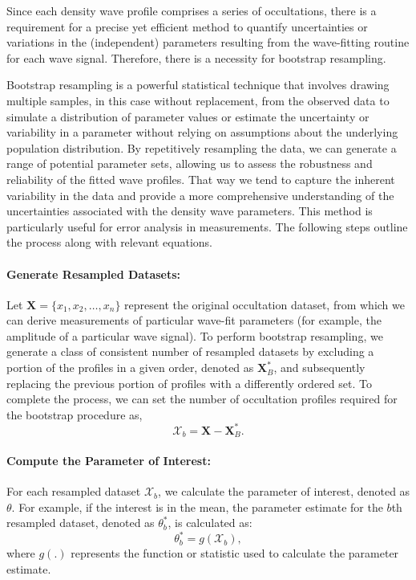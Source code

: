 \documentclass{article}
\begin{document}
Since each density wave profile comprises a series of occultations, there is a requirement for a precise yet efficient method to quantify uncertainties or variations in the (independent) parameters resulting from the wave-fitting routine for each wave signal. Therefore, there is a necessity for bootstrap resampling.

Bootstrap resampling is a powerful statistical technique that involves drawing multiple samples, in this case without replacement, from the observed data to simulate a distribution of parameter values or estimate the uncertainty or variability in a parameter without relying on assumptions about the underlying population distribution\cite{Chernick2007BootstrapMA,davison_hinkley_1997}. By repetitively resampling the data, we can generate a range of potential parameter sets, allowing us to assess the robustness and reliability of the fitted wave profiles. That way we tend to capture the inherent variability in the data and provide a more comprehensive understanding of the uncertainties associated with the density wave parameters\cite{Efron1994AnIT,article}. This method is particularly useful for error analysis in measurements. The following steps outline the process along with relevant equations.

\paragraph{Generate Resampled Datasets:}
Let $\mathbf{X} = \{x_1, x_2, \ldots, x_n\}$ represent the original occultation dataset, from which we can derive measurements of particular wave-fit parameters (for example, the amplitude of a particular wave signal). To perform bootstrap resampling, we generate a class of consistent number of resampled datasets by excluding a portion of the profiles in a given order, denoted as $\mathbf{X}^{*}_B$, and subsequently replacing the previous portion of profiles with a differently ordered set\cite{Chernick2007BootstrapMA,davison_hinkley_1997,Efron1994AnIT,article}. To complete the process, we can set the number of occultation profiles required for the bootstrap procedure as,
\begin{equation}
    \mathcal{X}_{b}= \mathbf{X}-\mathbf{X}^{*}_B.
\end{equation}

\paragraph{Compute the Parameter of Interest:}
For each resampled dataset $\mathcal{X}_{b}$, we calculate the parameter of interest, denoted as $\theta$. For example, if the interest is in the mean, the parameter estimate for the $b$th resampled dataset, denoted as $\theta^{*}_{b}$, is calculated as\cite{Chernick2007BootstrapMA,davison_hinkley_1997,Efron1994AnIT,article}:
\begin{equation}
\theta^{*}_{b} = g(\mathcal{X}_{b}),
\end{equation}
where $g(.)$ represents the function or statistic used to calculate the parameter estimate.
\end{document}
